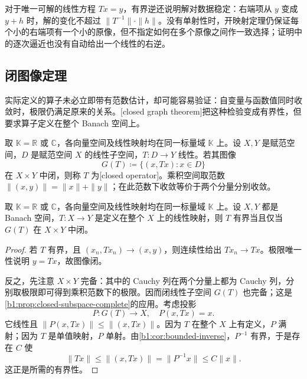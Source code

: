 \ProseParagraphBreak

对于唯一可解的线性方程 \(Tx=y\)，有界逆还说明解对数据稳定：右端项从 \(y\) 变成 \(y+h\) 时，解的变化不超过 \(\|T^{-1}\|\cdot\|h\|\)。没有单射性时，开映射定理仍保证每个小的右端项有一个小的原像，但不指定如何在多个原像之间作一致选择；证明中的逐次逼近也没有自动给出一个线性的右逆。

\subsection{闭图像定理}
\label{b1:subsec:080304}

实际定义的算子未必立即带有范数估计，却可能容易验证：自变量与函数值同时收敛时，极限仍满足原来的关系。[closed graph theorem]把这种检验变成有界性，但要求算子定义在整个 Banach 空间上。

\begin{definition}
\label{b1:def:closed-operator}
取 \(\mathbb K=\mathbb R\) 或 \(\mathbb C\)，各向量空间及线性映射均在同一标量域 \(\mathbb K\) 上。设 \(X,Y\) 是赋范空间，\(D\) 是赋范空间 \(X\) 的线性子空间，\(T:D\to Y\) 线性。若其图像
\[
 G(T)\coloneqq\{(x,Tx):x\in D\}
\]
在 \(X\times Y\) 中闭，则称 \(T\) 为[closed operator]。乘积空间取范数 \(\|(x,y)\|=\|x\|+\|y\|\)；在此范数下收敛等价于两个分量分别收敛。
\end{definition}

\begin{theorem}[闭图像]
\label{b1:thm:closed-graph}
取 \(\mathbb K=\mathbb R\) 或 \(\mathbb C\)，各向量空间及线性映射均在同一标量域 \(\mathbb K\) 上。设 \(X,Y\) 都是 Banach 空间，\(T:X\to Y\) 是定义在整个 \(X\) 上的线性映射，则 \(T\) 有界当且仅当 \(G(T)\) 在 \(X\times Y\) 中闭。
\end{theorem}

\begin{proof}
若 \(T\) 有界，且 \((x_n,Tx_n)\to(x,y)\)，则连续性给出 \(Tx_n\to Tx\)。极限唯一性说明 \(y=Tx\)，故图像闭。

反之，先注意 \(X\times Y\) 完备：其中的 Cauchy 列在两个分量上都为 Cauchy 列，分别取极限即可得到乘积范数下的极限。因而闭线性子空间 \(G(T)\) 也完备；这是\cref{b1:prop:closed-subspace-complete}的应用。考虑投影
\[
 P:G(T)\longrightarrow X,\quad P(x,Tx)=x.
\]
它线性且 \(\|P(x,Tx)\|\le\|(x,Tx)\|\)。因为 \(T\) 在整个 \(X\) 上有定义，\(P\) 满射；因为 \(T\) 是单值映射，\(P\) 单射。由\cref{b1:cor:bounded-inverse}，\(P^{-1}\) 有界，于是存在 \(C\) 使
\[
 \|Tx\|\le\|(x,Tx)\|=\|P^{-1}x\|\le C\|x\|.
\]
这正是所需的有界性。
\end{proof}

